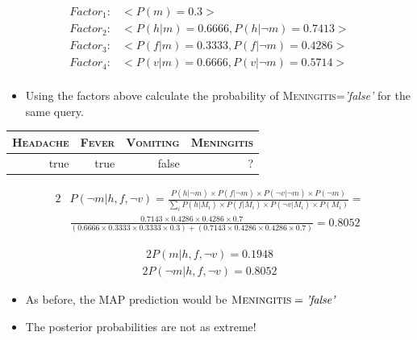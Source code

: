 \documentclass[xcolor={table}]{beamer}
\newcommand{\featN}[1]{\textsc{#1}}
\newcommand{\featL}[1]{\textit{'#1'}}
\begin{document}
\begin{frame}
\begin{equation*}
\begin{alignedat}{2}
Factor_1: & <P(m)=0.3>\\
Factor_2: & < P(h|m)=0.6666, P(h|\lnot m)=0.7413 >\\
Factor_3: & < P(f|m)=0.3333, P(f|\lnot m)=0.4286 >\\
Factor_4: & < P(v|m)=0.6666, P(v|\lnot m)=0.5714 >\\
\end{alignedat}
\end{equation*}
\begin{itemize}
	\item Using the factors above calculate the probability of \featN{Meningitis}=\featL{false} for the same query.
\end{itemize}
\begin{table}
\begin{footnotesize}
\begin{tabular}{rrrr}
\hline
\featN{Headache} & \featN{Fever} & \featN{Vomiting} & \featN{Meningitis}\\
\hline
true & true & false & ?\\
\hline
\end{tabular}
\end{footnotesize}
\end{table}
\end{frame}



 \begin{frame} 
 \begin{footnotesize}
\begin{alignat*}{2}
&P(\lnot m| h, f, \lnot v)=\frac{ P(h|\lnot m)  \times P(f|\lnot m) \times P(\lnot v|\lnot m) \times P(\lnot m)}{ \sum_{i}  P(h|M_i) \times P(f|M_i) \times P(\lnot v|M_i) \times P(M_i)}=\\
&\frac{ 0.7143 \times 0.4286\times 0.4286 \times 0.7 }{( 0.6666 \times 0.3333 \times 0.3333 \times  0.3 ) + ( 0.7143 \times 0.4286\times 0.4286 \times 0.7 ) }=0.8052
\end{alignat*}
\end{footnotesize}
\end{frame} 


\begin{frame}
\begin{alignat*}{2}
P(m| h, f, \lnot v)= 0.1948
\end{alignat*}
\begin{alignat*}{2}
P(\lnot m| h, f, \lnot v)=0.8052
\end{alignat*}
\begin{itemize}
	\item As before, the MAP prediction  would be $\featN{Meningitis}=\featL{false}$
	\item The posterior probabilities are not as extreme!
\end{itemize}
\end{frame}
\end{document}
